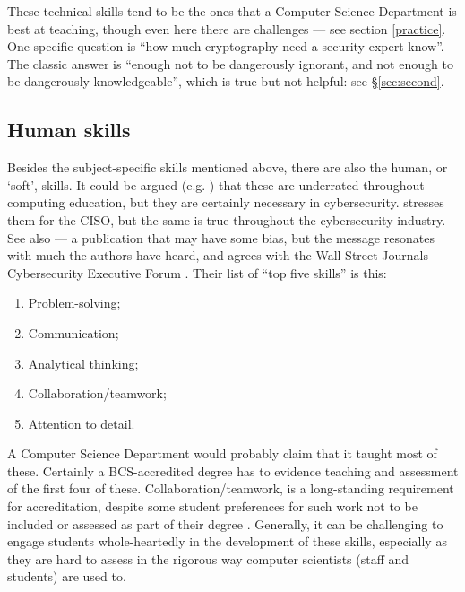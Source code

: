 \documentclass[conference]{IEEEtran}
\begin{document}
\begin{itemize}
These technical skills tend to be the ones that a Computer Science Department is best at teaching, though even here there are challenges --- see section \ref{practice}. One specific question is ``how much cryptography need a security expert know''. The classic answer is ``enough not to be dangerously ignorant, and not enough to be dangerously knowledgeable'', which is true but not helpful: see \S\ref{sec:second}.
\end{itemize}
\subsection{Human skills}\label{sec:human}
Besides the subject-specific skills mentioned above, there are also the human, or `soft', skills. It could be argued (e.g. \cite{Palkar2013a}) that these are underrated throughout computing education, but they are certainly necessary in cybersecurity.
\cite{Froehlich2019a} stresses them for the CISO, but the same is true throughout the cybersecurity industry. See also \cite{InfoSec2019a} ---  a publication that may have some bias, but the message resonates with much the authors have heard, and agrees with the Wall Street Journals Cybersecurity Executive Forum \cite{WallStreetJournal2018c}. Their list of ``top five skills'' is this:
\begin{enumerate}
\item    Problem-solving;
\item    Communication;
\item    Analytical thinking;
\item    Collaboration/teamwork;
\item    Attention to detail.
\end{enumerate}

A Computer Science Department would probably claim that it taught most of these. Certainly a BCS-accredited degree has to evidence teaching and assessment of the first four of these. Collaboration/teamwork, is a long-standing requirement for accreditation, despite some student preferences %
for such work not to be included or assessed as part of their degree \cite{Cricketal2020a}. Generally, it can be challenging to engage students whole-heartedly in the development of these skills, especially as they are hard to assess in the rigorous way computer scientists (staff and students) are used to. 
\end{document}

